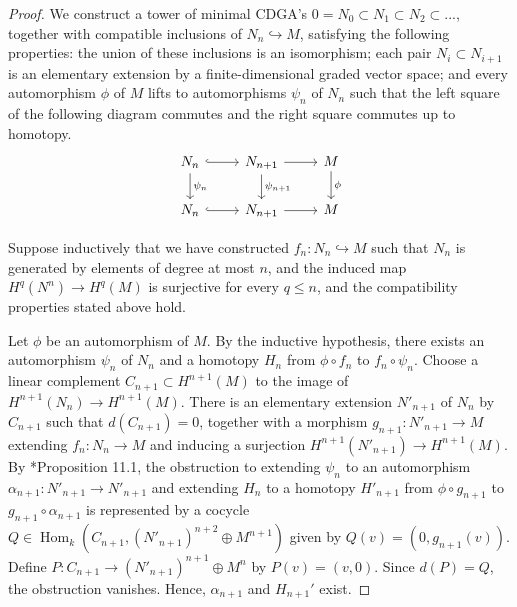 \documentclass[11pt]{amsart}
\theoremstyle{definition}
\numberwithin{equation}{section}
\numberwithin{equation}{section}
\DeclareMathOperator{\homo}{Hom}
\begin{document}
\begin{proof}
We construct a tower of minimal CDGA's $0=N_0\subset N_1\subset N_2\subset ...$, together with compatible inclusions of $N_n\hookrightarrow M$, satisfying the following properties: the union of these inclusions is an isomorphism; each pair $N_i\subset N_{i+1}$ is an elementary extension by a finite-dimensional graded vector space; and every automorphism $\phi$ of $M$ lifts to automorphisms $\psi_n$ of $N_n$ such that the left square of the following diagram commutes and the right square commutes up to homotopy.
\[
\begin{tikzcd}
    N_{n} \arrow[r,hook] \arrow[d,"\psi_{n}"] & N_{n+1} \arrow[r] \arrow[d,"\psi_{n+1}"] & M \arrow[d,"\phi"] \\
    N_{n} \arrow[r,hook] & N_{n+1} \arrow[r] & M
\end{tikzcd}
\]

Suppose inductively that we have constructed $f_n:N_n\hookrightarrow M$ such that $N_n$ is generated by elements of degree at most $n$, and the induced map  $H^q(N^n)\rightarrow H^q(M)$ is surjective for every $q\leq n$, and the compatibility properties stated above hold.

Let $\phi$ be an automorphism of $M$. By the inductive hypothesis, there exists an automorphism $\psi_n$ of $N_n$ and a homotopy $H_n$ from $\phi\circ f_n$ to $f_n\circ \psi_n$. Choose a linear complement $C_{n+1}\subset H^{n+1}(M)$ to the image of $H^{n+1}(N_n)\rightarrow H^{n+1}(M)$. There is an elementary extension $N'_{n+1}$ of $N_n$ by $C_{n+1}$ such that $d(C_{n+1})=0$, together with a morphism $g_{n+1}:N'_{n+1}\rightarrow M$ extending $f_n:N_{n}\rightarrow M$ and inducing a surjection $H^{n+1}(N'_{n+1})\rightarrow H^{n+1}(M)$. 
By \cite{MGriffiths-Morgan-rational-homotopy}*{Proposition 11.1}, the obstruction to extending $\psi_n$ to an automorphism $\alpha_{n+1}:N'_{n+1}\rightarrow N'_{n+1}$  and extending $H_n$ to a homotopy $H'_{n+1}$ from $\phi\circ g_{n+1}$ to  $g_{n+1}\circ \alpha_{n+1}$ is represented by a cocycle $Q\in \homo_k(C_{n+1},(N'_{n+1})^{n+2}\oplus M^{n+1})$ given by $Q(v)=(0,g_{n+1}(v))$. Define $P:C_{n+1}\rightarrow (N'_{n+1})^{n+1}\oplus M^{n}$ by $P(v)=(v,0)$. Since $d(P)=Q$, the obstruction vanishes. Hence, $\alpha_{n+1}$ and $H_{n+1}'$ exist.



\end{proof}
\end{document}
